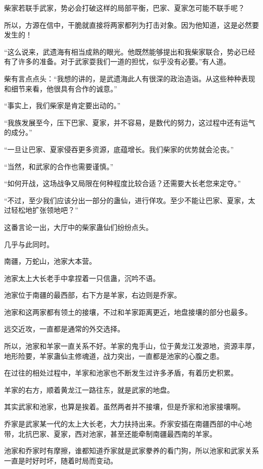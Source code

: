 \begin{this_body}
柴家若联手武家，势必会打破这样的局部平衡，巴家、夏家怎可能不联手呢？

所以，方源在信中，干脆就直接将两家都列为打击对象。因为他知道，这是必然要发生的！

“这么说来，武遗海有相当成熟的眼光。他既然能够提出和我柴家联合，势必已经有了许多的准备。对于武家耍我们一道的担忧，似乎没有必要。”有人道。

柴有言点点头：“我想的讲的，是武遗海此人有很深的政治造诣。从这些种种表现和细节来看，他很具有合作的诚意。”

“事实上，我们柴家是肯定要出动的。”

“我族发展至今，压下巴家、夏家，并不容易，是数代的努力，这过程中还有运气的成分。”

“一旦让巴家、夏家侵吞更多资源，底蕴增长。我们柴家的优势就会沦丧。”

“当然，和武家的合作也需要谨慎。”

“如何开战，这场战争又局限在何种程度比较合适？还需要大长老您来定夺。”

“不过，至少我们应该分出一部分的蛊仙，进行佯攻。至少不能让巴家、夏家，太过轻松地扩张领地吧？”

这番言论一出，大厅中的柴家蛊仙们纷纷点头。

几乎与此同时。

南疆，万蛇山，池家大本营。

池家太上大长老手中拿捏着一只信蛊，沉吟不语。

池家位于南疆的最西部，右下方是羊家，右边则是乔家。

池家和这两家都有领土的接壤，不过和羊家距离更近，地盘接壤的部分也最多。

远交近攻，一直都是通常的外交选择。

所以，池家和羊家一直关系不好。羊家的鬼手山，位于黄龙江发源地，资源丰厚，地形险要，羊家蛊仙主修魂道，战力突出，一直都是池家的心腹之患。

在过往的相处过程中，羊家和池家也不断发生过许多矛盾，有着历史积累。

羊家的右方，顺着黄龙江一路往东，就是武家的地盘。

其实武家和池家，也算是挨着。虽然两者并不接壤，但是乔家和池家接壤啊。

乔家是武家某一代的太上大长老，大力扶持出来。乔家安插在南疆西部的中心地带，北抗巴家、夏家，西对池家，甚至还能牵制南疆最西南的羊家。

池家和乔家时有摩擦，谁都知道乔家就是武家豢养的看门狗，所以池家和武家关系一直是时好时坏，随着时局而变动。


\end{this_body}
